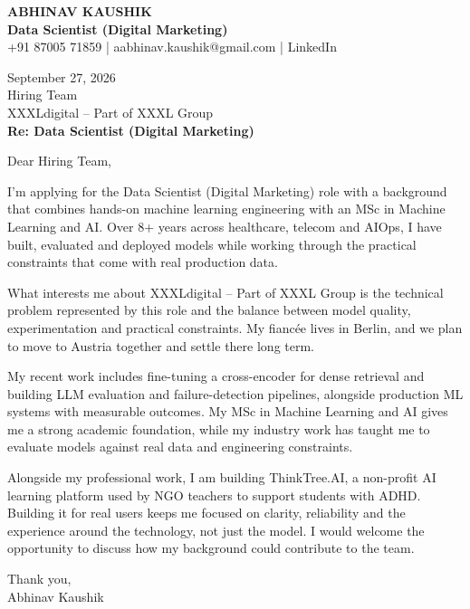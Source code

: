 \documentclass[10pt,a4paper]{article}
\begin{document}
\begin{center}
{\Large\bfseries ABHINAV KAUSHIK}\\[2pt]
{\bfseries Data Scientist (Digital Marketing)}\\[2pt]
+91 87005 71859 \quad | \quad aabhinav.kaushik@gmail.com \quad | \quad LinkedIn
\end{center}
\vspace{8pt}
September 27, 2026\\[6pt]
Hiring Team\\
XXXLdigital – Part of XXXL Group\\[4pt]
\textbf{Re: Data Scientist (Digital Marketing)}

Dear Hiring Team,

I’m applying for the Data Scientist (Digital Marketing) role with a background that combines hands-on machine learning engineering with an MSc in Machine Learning and AI. Over 8+ years across healthcare, telecom and AIOps, I have built, evaluated and deployed models while working through the practical constraints that come with real production data.

What interests me about XXXLdigital – Part of XXXL Group is the technical problem represented by this role and the balance between model quality, experimentation and practical constraints. My fiancée lives in Berlin, and we plan to move to Austria together and settle there long term.

My recent work includes fine-tuning a cross-encoder for dense retrieval and building LLM evaluation and failure-detection pipelines, alongside production ML systems with measurable outcomes. My MSc in Machine Learning and AI gives me a strong academic foundation, while my industry work has taught me to evaluate models against real data and engineering constraints.

Alongside my professional work, I am building ThinkTree.AI, a non-profit AI learning platform used by NGO teachers to support students with ADHD. Building it for real users keeps me focused on clarity, reliability and the experience around the technology, not just the model. I would welcome the opportunity to discuss how my background could contribute to the team.

Thank you,\\
Abhinav Kaushik
\end{document}
